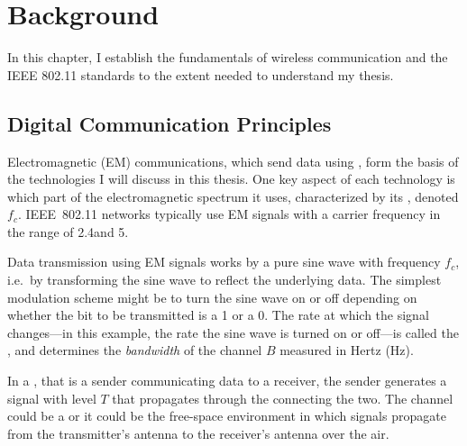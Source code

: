\ifx\mainfile\undefined

\setcounter{chapter}{1} %
\fi

\cleardoublepage
\chapter{Background}
\label{chap:background}

In this chapter, I establish the fundamentals of wireless communication and the IEEE 802.11 standards to the extent needed to understand my thesis.

\section{Digital Communication Principles}
Electromagnetic (EM) communications, which send data using , form the basis of the technologies I will discuss in this thesis. One key aspect of each technology is which part of the electromagnetic spectrum it uses, characterized by its , denoted $f_c$. IEEE~802.11 networks typically use EM signals with a carrier frequency in the range of 2.4\GHz and 5\GHz.

Data transmission using EM signals works by  a pure sine wave with frequency $f_c$, i.e.\ by transforming the sine wave to reflect the underlying data. The simplest modulation scheme might be to turn the sine wave on or off depending on whether the bit to be transmitted is a 1 or a 0. The rate at which the signal changes---in this example, the rate the sine wave is turned on or off---is called the , and determines the \emph{bandwidth} of the channel $B$ measured in Hertz (Hz).

In a , that is a sender communicating data to a receiver, the sender generates a signal with  level $T$ that propagates through the  connecting the two. The channel could be a  or it could be the free-space  environment in which signals propagate from the transmitter's antenna to the receiver's antenna over the air.


